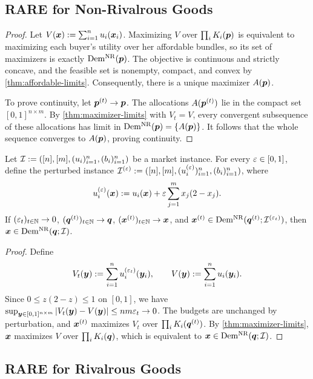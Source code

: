 \subsection{RARE for Non-Rivalrous Goods}
\label{sec:exist-extra:non-rival}

\thmUniqueNrDemand*
\begin{proof}
Let $V(\bm{x}) := \sum_{i=1}^n u_i(\bm{x}_i)$.
Maximizing $V$ over $\prod_i K_i(\bm{p})$ is equivalent to maximizing each buyer's utility
over her affordable bundles, so its set of maximizers is exactly $\operatorname{Dem^{\mathrm{NR}}}(\bm{p})$.
The objective is continuous and strictly concave, and the feasible set is nonempty,
compact, and convex by \cref{thm:affordable-limits}.
Consequently, there is a unique maximizer $A(\bm{p})$.

To prove continuity, let $\bm{p}^{(t)} \to \bm{p}$.
The allocations $A(\bm{p}^{(t)})$ lie in the compact set $[0, 1]^{n \times m}$.
By \cref{thm:maximizer-limits} with $V_t = V$, every convergent subsequence of these
allocations has limit in $\operatorname{Dem^{\mathrm{NR}}}(\bm{p}) = \{A(\bm{p})\}$.
It follows that the whole sequence converges to $A(\bm{p})$, proving continuity.
\end{proof}

\begin{lemma}
\label{thm:demand-limit}
Let $\mathcal{I} := ([n], [m], (u_i)_{i=1}^n, (b_i)_{i=1}^n)$ be a market instance.
For every $\varepsilon \in [0, 1]$, define the perturbed instance
$\mathcal{I}^{(\varepsilon)} := ([n], [m], (u_i^{(\varepsilon)})_{i=1}^n, (b_i)_{i=1}^n)$, where
\[ u_i^{(\varepsilon)}(\bm{x}) := u_i(\bm{x}) + \varepsilon \sum_{j=1}^m x_j(2 - x_j). \]
If $(\varepsilon_t)_{t \in \mathbb{N}} \to 0$, $(\bm{q}^{(t)})_{t \in \mathbb{N}} \to \bm{q}$, $(\bm{x}^{(t)})_{t \in \mathbb{N}} \to \bm{x}$,
and $\bm{x}^{(t)} \in \operatorname{Dem^{\mathrm{NR}}}(\bm{q}^{(t)}; \mathcal{I}^{(\varepsilon_t)})$, then $\bm{x} \in \operatorname{Dem^{\mathrm{NR}}}(\bm{q}; \mathcal{I})$.
\end{lemma}
\begin{proof}
Define
\[ V_t(\bm{y}) := \sum_{i=1}^n u_i^{(\varepsilon_t)}(\bm{y}_i),
    \qquad V(\bm{y}) := \sum_{i=1}^n u_i(\bm{y}_i). \]
Since $0 \le z(2 - z) \le 1$ on $[0, 1]$, we have
$\sup_{\bm{y} \in [0, 1]^{n \times m}} |V_t(\bm{y}) - V(\bm{y})| \le nm\varepsilon_t \to 0$.
The budgets are unchanged by perturbation, and $\bm{x}^{(t)}$ maximizes $V_t$
over $\prod_i K_i(\bm{q}^{(t)})$.
By \cref{thm:maximizer-limits}, $\bm{x}$ maximizes $V$ over $\prod_i K_i(\bm{q})$,
which is equivalent to $\bm{x} \in \operatorname{Dem^{\mathrm{NR}}}(\bm{q}; \mathcal{I})$.
\end{proof}

\subsection{RARE for Rivalrous Goods}
\label{sec:exist-extra:rival}

